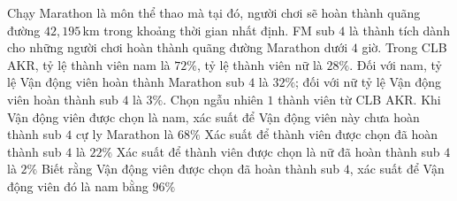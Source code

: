 \begin{ex}%
	Chạy Marathon là môn thể thao mà tại đó, người chơi sẽ hoàn thành quãng đường $42{,}195$\,km trong khoảng thời gian nhất định. FM sub $4$ là thành tích dành cho những người chơi hoàn thành quãng đường Marathon dưới $4$ giờ. Trong CLB AKR, tỷ lệ thành viên nam là $72\%$, tỷ lệ thành viên nữ là $28\%$. Đối với nam, tỷ lệ Vận động viên hoàn thành Marathon sub $4$ là $32\%$; đối với nữ tỷ  lệ Vận động viên hoàn thành sub $4$ là $3\%$. Chọn ngẫu nhiên $1$ thành viên từ CLB AKR.
	 \choiceTF
		{\True Khi Vận động viên được chọn là nam, xác suất để Vận động viên này chưa hoàn thành sub $4$ cự ly Marathon  là $68\%$}
		{Xác suất để  thành viên được chọn đã hoàn thành sub $4$ là $22\%$}
		{Xác suất để thành viên được chọn là  nữ đã hoàn thành sub $4$ là $2\%$}
		{\True Biết  rằng Vận động viên được chọn đã hoàn thành sub $4$, xác suất để Vận động viên đó là nam bằng $96\%$}
\end{ex}


